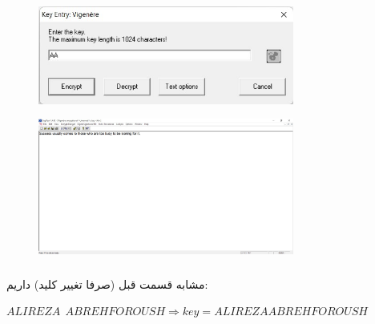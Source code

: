 \documentclass{article}
\begin{document}
\begin{figure}[H]
    \centering
    \includegraphics[width=0.75\textwidth]{figures/3ab.jpg}
    \caption
	{}
    \label{fig:fig1}
\end{figure}

\begin{figure}[H]
    \centering
    \includegraphics[width=0.75\textwidth]{figures/3ac.jpg}
    \caption
	{}
    \label{fig:fig1}
\end{figure}

\subsubsection{}
مشابه قسمت قبل (صرفا تغییر کلید) داریم:
\begin{latin}
$
ALIREZA\:\:ABREHFOROUSH \Rightarrow key = ALIREZAABREHFOROUSH
$
\end{latin}
\end{document}
